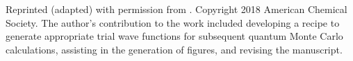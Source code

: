 Reprinted (adapted) with permission from .
Copyright 2018 American Chemical Society.
The author's contribution to the work included developing a recipe to generate appropriate trial wave functions for subsequent quantum Monte Carlo calculations, assisting in the generation of figures, and revising the manuscript.
